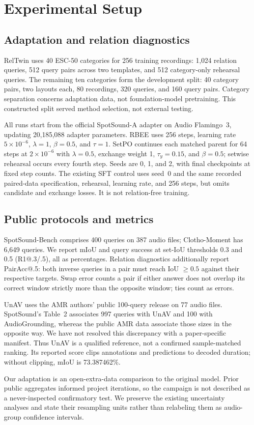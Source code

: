 \section{Experimental Setup}
\subsection{Adaptation and relation diagnostics}
RelTwin uses 40 ESC-50 categories for 256 training recordings: 1,024 relation queries, 512 query pairs across two templates, and 512 category-only rehearsal queries. The remaining ten categories form the development split: 40 category pairs, two layouts each, 80 recordings, 320 queries, and 160 query pairs. Category separation concerns adaptation data, not foundation-model pretraining. This constructed split served method selection, not external testing.

All runs start from the official SpotSound-A adapter on Audio Flamingo~3, updating 20,185,088 adapter parameters. RBEE uses 256 steps, learning rate $5\!\times\!10^{-6}$, $\lambda=1$, $\beta=0.5$, and $\tau=1$. SetPO continues each matched parent for 64 steps at $2\!\times\!10^{-6}$ with $\lambda=0.5$, exchange weight 1, $\tau_y=0.15$, and $\beta=0.5$; setwise rehearsal occurs every fourth step. Seeds are 0, 1, and 2, with final checkpoints at fixed step counts. The existing SFT control uses seed~0 and the same recorded paired-data specification, rehearsal, learning rate, and 256 steps, but omits candidate and exchange losses. It is not relation-free training.

\subsection{Public protocols and metrics}
SpotSound-Bench comprises 400 queries on 387 audio files; Clotho-Moment has 6,649 queries. We report mIoU and query success at set-IoU thresholds 0.3 and 0.5 (R1@.3/.5), all as percentages. Relation diagnostics additionally report PairAcc@.5: both inverse queries in a pair must reach IoU $\geq0.5$ against their respective targets. Swap error counts a pair if either answer does not overlap its correct window strictly more than the opposite window; ties count as errors.

UnAV uses the AMR authors' public 100-query release on 77 audio files. SpotSound's Table~2 associates 997 queries with UnAV and 100 with AudioGrounding, whereas the public AMR data associate those sizes in the opposite way. We have not resolved this discrepancy with a paper-specific manifest. Thus UnAV is a qualified reference, not a confirmed sample-matched ranking. Its reported score clips annotations and predictions to decoded duration; without clipping, mIoU is 73.387462\%.

Our adaptation is an open-extra-data comparison to the original model. Prior public aggregates informed project iterations, so the campaign is not described as a never-inspected confirmatory test. We preserve the existing uncertainty analyses and state their resampling units rather than relabeling them as audio-group confidence intervals.
